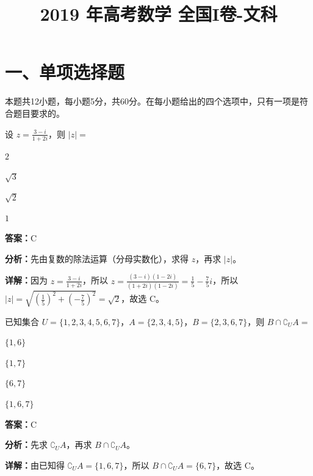 ﻿\title{2019 年高考数学 全国I卷-文科}
\date{}
\maketitle

\section*{一、单项选择题}
本题共12小题，每小题5分，共60分。在每小题给出的四个选项中，只有一项是符合题目要求的。

\begin{question}[points=5]
设 $z = \frac{3-i}{1+2i}$，则 $|z| =$
\begin{choices}
  \item $2$
  \item $\sqrt{3}$
  \item $\sqrt{2}$
  \item $1$
\end{choices}
\begin{solution}
\textbf{答案：}C

\textbf{分析：}先由复数的除法运算（分母实数化），求得 $z$，再求 $|z|$。

\textbf{详解：}因为 $z = \frac{3-i}{1+2i}$，所以 $z = \frac{(3-i)(1-2i)}{(1+2i)(1-2i)} = \frac{1}{5} - \frac{7}{5}i$，所以 $|z| = \sqrt{\left(\frac{1}{5}\right)^2 + \left(-\frac{7}{5}\right)^2} = \sqrt{2}$，故选 C。
\end{solution}
\end{question}

\begin{question}[points=5]
已知集合 $U = \{1,2,3,4,5,6,7\}$，$A = \{2,3,4,5\}$，$B = \{2,3,6,7\}$，则 $B \cap \complement_U A =$
\begin{choices}
  \item $\{1,6\}$
  \item $\{1,7\}$
  \item $\{6,7\}$
  \item $\{1,6,7\}$
\end{choices}
\begin{solution}
\textbf{答案：}C

\textbf{分析：}先求 $\complement_U A$，再求 $B \cap \complement_U A$。

\textbf{详解：}由已知得 $\complement_U A = \{1,6,7\}$，所以 $B \cap \complement_U A = \{6,7\}$，故选 C。
\end{solution}
\end{question}

